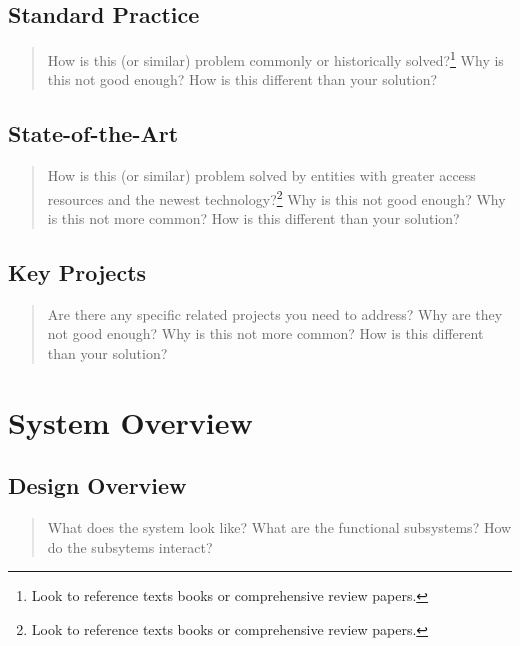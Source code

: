 \documentclass[
  10pt,
  draftcls,
  technote,
  letterpaper,
  oneside,
  onecolumn]{IEEEtran}
\begin{document}
\hypertarget{standard-practice}{%
\subsection{Standard Practice}\label{standard-practice}}

\begin{quote}
How is this (or similar) problem commonly or historically
solved?\footnote{Look to reference texts books or comprehensive review
  papers.} Why is this not good enough? How is this different than your
solution?
\end{quote}

\hypertarget{state-of-the-art}{%
\subsection{State-of-the-Art}\label{state-of-the-art}}

\begin{quote}
How is this (or similar) problem solved by entities with greater access
resources and the newest technology?\footnote{Look to reference texts
  books or comprehensive review papers.} Why is this not good enough?
Why is this not more common? How is this different than your solution?
\end{quote}

\hypertarget{key-projects}{%
\subsection{Key Projects}\label{key-projects}}

\begin{quote}
Are there any specific related projects you need to address? Why are
they not good enough? Why is this not more common? How is this different
than your solution?
\end{quote}

\hypertarget{system-overview}{%
\section{System Overview}\label{system-overview}}

\hypertarget{design-overview}{%
\subsection{Design Overview}\label{design-overview}}

\begin{quote}
What does the system look like? What are the functional subsystems? How
do the subsytems interact?
\end{quote}
\end{document}
